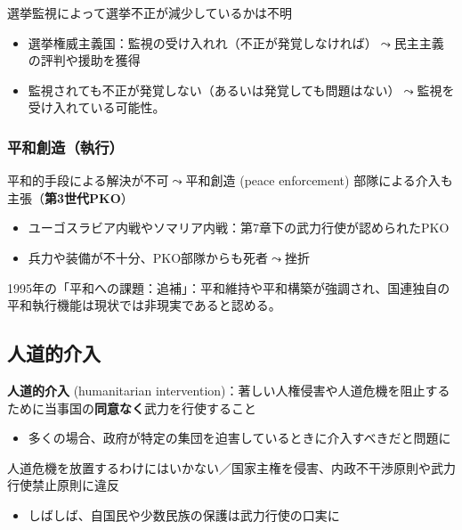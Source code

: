 \documentclass[
  xelatex,
  ja=standard]{bxjsarticle}
\providecommand{\tightlist}{%
  \setlength{\itemsep}{0pt}\setlength{\parskip}{0pt}}\usepackage{longtable,booktabs,array}
\begin{document}
選挙監視によって選挙不正が減少しているかは不明

\begin{itemize}
\tightlist
\item
  選挙権威主義国：監視の受け入れれ（不正が発覚しなければ）\(\leadsto\)民主主義の評判や援助を獲得
\item
  監視されても不正が発覚しない（あるいは発覚しても問題はない）\(\leadsto\)監視を受け入れている可能性。
\end{itemize}

\hypertarget{ux5e73ux548cux5275ux9020ux57f7ux884c}{%
\subsubsection{平和創造（執行）}\label{ux5e73ux548cux5275ux9020ux57f7ux884c}}

平和的手段による解決が不可\(\leadsto\)平和創造 (peace enforcement)
部隊による介入も主張（\textbf{第3世代PKO}）

\begin{itemize}
\tightlist
\item
  ユーゴスラビア内戦やソマリア内戦：第7章下の武力行使が認められたPKO
\item
  兵力や装備が不十分、PKO部隊からも死者\(\leadsto\)挫折
\end{itemize}

1995年の「平和への課題：追補」：平和維持や平和構築が強調され、国連独自の平和執行機能は現状では非現実であると認める。

\hypertarget{ux4ebaux9053ux7684ux4ecbux5165}{%
\subsection{人道的介入}\label{ux4ebaux9053ux7684ux4ecbux5165}}

\textbf{人道的介入} (humanitarian
intervention)：著しい人権侵害や人道危機を阻止するために当事国の\textbf{同意なく}武力を行使すること

\begin{itemize}
\tightlist
\item
  多くの場合、政府が特定の集団を迫害しているときに介入すべきだと問題に
\end{itemize}

人道危機を放置するわけにはいかない／国家主権を侵害、内政不干渉原則や武力行使禁止原則に違反

\begin{itemize}
\tightlist
\item
  しばしば、自国民や少数民族の保護は武力行使の口実に
\end{itemize}
\end{document}
